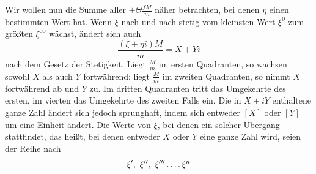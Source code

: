 Wir wollen nun die Summe aller $\pm\Theta\frac{fM}{m}$ näher betrachten, bei denen $\eta$ einen bestimmten Wert hat. Wenn $\xi$ nach und nach stetig vom kleinsten Wert $\xi^0$ zum größten $\xi^{00}$ wächst, ändert sich auch
\[
\frac{(\xi+\eta i)M}{m}=X+Yi
\]
nach dem Gesetz der Stetigkeit. Liegt $\frac{M}{m}$ im ersten Quadranten, so wachsen sowohl $X$ als auch $Y$ fortwährend; liegt $\frac{M}{m}$ im zweiten Quadranten, so nimmt $X$ fortwährend ab und $Y$ zu. Im dritten Quadranten tritt das Umgekehrte des ersten, im vierten das Umgekehrte des zweiten Falls ein. Die in $X+iY$ enthaltene ganze Zahl ändert sich jedoch sprunghaft, indem sich entweder $[X]$ oder $[Y]$ um eine Einheit ändert. Die Werte von $\xi$, bei denen ein solcher Übergang stattfindet, das heißt, bei denen entweder $X$ oder $Y$ eine ganze Zahl wird, seien der Reihe nach
\[
\xi',\ \xi'',\ \xi'''\mathinner{.\,.\,.\,.}\xi^n
\]

